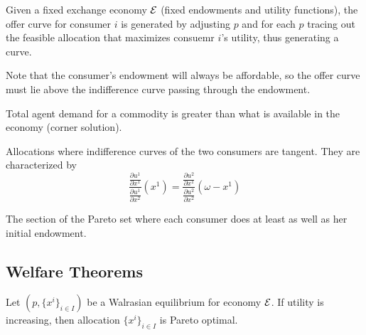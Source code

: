 \begin{definition}
  Given a fixed exchange economy ${\cal E}$ (fixed endowments and
  utility functions), the offer curve for consumer $i$ is generated by
  adjusting $p$ and for each $p$ tracing out the feasible allocation
  that maximizes consuemr $i$'s utility, thus generating a curve. 
\end{definition}

Note that the consumer's endowment will always be affordable, so the
offer curve must lie above the indifference curve passing through the
endowment.

\begin{definition}
  Total agent demand for a commodity is greater than what is available
  in the economy (corner solution).
\end{definition}

\begin{definition}
  Allocations where indifference curves of the two consumers are
  tangent. They are characterized by
  \[
  \frac{
    \frac{\partial u^1}{\partial x^1}
  } {
    \frac{\partial u^1}{\partial x^2}
  }
  (x^1)
  =
  \frac{
    \frac{\partial u^2}{\partial x^1}
  } {
    \frac{\partial u^2}{\partial x^2}
  } (\omega - x^1)
  \]
\end{definition}

\begin{definition}
  The section of the Pareto set where each consumer does at least as
  well as her initial endowment.
\end{definition}

\subsection{Welfare Theorems}
\label{sec:welfare-theorems}



\begin{theorem}
  Let $(p, \{x^i\}_{i \in I})$ be a Walrasian equilibrium for economy
  ${\cal E}$. If utility is increasing, then allocation $\{x^i\}_{i
    \in I}$ is Pareto optimal.
\end{theorem}

